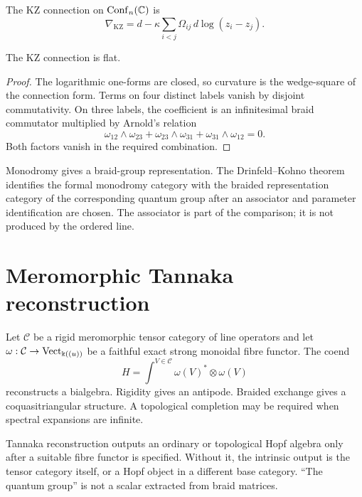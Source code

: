 The KZ connection on \(\operatorname{Conf}_n(\mathbb C)\) is
\[
 \nabla_{\mathrm{KZ}}
 =d-\kappa\sum_{i<j}\Omega_{ij}\,d\log(z_i-z_j).
\]

\begin{proposition}[KZ flatness]\label{prop:kz-flat}
The KZ connection is flat.
\end{proposition}
\begin{proof}
The logarithmic one-forms are closed, so curvature is the wedge-square of the connection form.  Terms on four distinct labels vanish by disjoint commutativity.  On three labels, the coefficient is an infinitesimal braid commutator multiplied by Arnold's relation
\[
 \omega_{12}\wedge\omega_{23}
 +\omega_{23}\wedge\omega_{31}
 +\omega_{31}\wedge\omega_{12}=0.
\]
Both factors vanish in the required combination.
\end{proof}

Monodromy gives a braid-group representation.  The Drinfeld--Kohno theorem identifies the formal monodromy category with the braided representation category of the corresponding quantum group after an associator and parameter identification are chosen.  The associator is part of the comparison; it is not produced by the ordered line.

\section{Meromorphic Tannaka reconstruction}
Let \(\mathcal C\) be a rigid meromorphic tensor category of line operators and let \(\omega:\mathcal C\to\operatorname{Vect}_{\Bbbk((u))}\) be a faithful exact strong monoidal fibre functor.  The coend
\[
 H=\int^{V\in\mathcal C}\omega(V)^*\otimes\omega(V)
\]
reconstructs a bialgebra.  Rigidity gives an antipode.  Braided exchange gives a coquasitriangular structure.  A topological completion may be required when spectral expansions are infinite.

\begin{nogobox}[title={No-go theorem 20: a braided category without a fibre functor does not determine an ordinary Hopf algebra}]
Tannaka reconstruction outputs an ordinary or topological Hopf algebra only after a suitable fibre functor is specified.  Without it, the intrinsic output is the tensor category itself, or a Hopf object in a different base category.  ``The quantum group'' is not a scalar extracted from braid matrices.
\end{nogobox}

